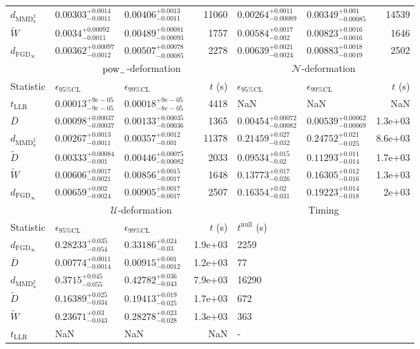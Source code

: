 \begin{tabular}{l|llr|llr}
	$d_{\mathrm{MMD}^{2}_{u}}$ & $0.00303_{-0.0011}^{+0.0014}$ & $0.00406_{-0.0011}^{+0.0013}$ & 11060 & $0.00264_{-0.00089}^{+0.0011}$ & $0.00349_{-0.00085}^{+0.001}$ & 14539 \\
	$\widetilde{W}$ & $0.0034_{-0.0011}^{+0.00092}$ & $0.00489_{-0.00093}^{+0.00081}$ & 1757 & $0.00584_{-0.002}^{+0.0017}$ & $0.00823_{-0.0016}^{+0.0016}$ & 1646 \\
	$d_{\mathrm{FGD}_{\infty}}$ & $0.00362_{-0.0012}^{+0.00097}$ & $0.00507_{-0.00085}^{+0.00078}$ & 2278 & $0.00639_{-0.0024}^{+0.0021}$ & $0.00883_{-0.0019}^{+0.0018}$ & 2502 \\
	\toprule
	\multicolumn{1}{c}{} & \multicolumn{3}{c}{$\rm{pow}_{-}$-deformation} & \multicolumn{3}{c}{$\mathcal{N}$-deformation} \\
	Statistic & $\epsilon_{95\%\mathrm{CL}}$ & $\epsilon_{99\%\mathrm{CL}}$ & $t$ (s) & $\epsilon_{95\%\mathrm{CL}}$ & $\epsilon_{99\%\mathrm{CL}}$ & $t$ (s) \\
	\midrule
	$t_{\mathrm{LLR}}$ & $0.00013_{-9e-05}^{+9e-05}$ & $0.00018_{-8e-05}^{+9e-05}$ & 4418 & NaN & NaN & NaN \\
	$\overline{D}$ & $0.00098_{-0.00037}^{+0.00037}$ & $0.00133_{-0.00036}^{+0.00035}$ & 1365 & $0.00454_{-0.00082}^{+0.00072}$ & $0.00539_{-0.00069}^{+0.00062}$ & 1.3e+03 \\
	$d_{\mathrm{MMD}^{2}_{u}}$ & $0.00267_{-0.0011}^{+0.0013}$ & $0.00357_{-0.001}^{+0.0012}$ & 11378 & $0.21459_{-0.032}^{+0.027}$ & $0.24752_{-0.025}^{+0.021}$ & 8.6e+03 \\
	$\widetilde{D}$ & $0.00333_{-0.001}^{+0.00084}$ & $0.00446_{-0.00082}^{+0.00075}$ & 2033 & $0.09534_{-0.02}^{+0.015}$ & $0.11293_{-0.014}^{+0.011}$ & 1.7e+03 \\
	$\widetilde{W}$ & $0.00606_{-0.0021}^{+0.0017}$ & $0.00856_{-0.0017}^{+0.0015}$ & 1648 & $0.13773_{-0.026}^{+0.017}$ & $0.16305_{-0.016}^{+0.012}$ & 1.3e+03 \\
	$d_{\mathrm{FGD}_{\infty}}$ & $0.00659_{-0.0024}^{+0.002}$ & $0.00905_{-0.0017}^{+0.0017}$ & 2507 & $0.16354_{-0.031}^{+0.02}$ & $0.19223_{-0.018}^{+0.014}$ & 2e+03 \\
	\toprule
	\multicolumn{1}{c}{} & \multicolumn{3}{c}{$\mathcal{U}$-deformation} & \multicolumn{3}{c}{Timing} \\
	Statistic & $\epsilon_{95\%\mathrm{CL}}$ & $\epsilon_{99\%\mathrm{CL}}$ & $t$ (s) & $t^{\mathrm{null}}$ (s) \\
	\midrule
	$d_{\mathrm{FGD}_{\infty}}$ & $0.28233_{-0.054}^{+0.035}$ & $0.33186_{-0.03}^{+0.024}$ & 1.9e+03 & 2259 \\
	$\overline{D}$ & $0.00774_{-0.0014}^{+0.0011}$ & $0.00915_{-0.0012}^{+0.001}$ & 1.2e+03 & 77 \\
	$d_{\mathrm{MMD}^{2}_{u}}$ & $0.3715_{-0.055}^{+0.045}$ & $0.42782_{-0.043}^{+0.036}$ & 7.9e+03 & 16290 \\
	$\widetilde{D}$ & $0.16389_{-0.034}^{+0.025}$ & $0.19413_{-0.025}^{+0.019}$ & 1.7e+03 & 672 \\
	$\widetilde{W}$ & $0.23671_{-0.043}^{+0.03}$ & $0.28278_{-0.028}^{+0.023}$ & 1.3e+03 & 363 \\
	$t_{\mathrm{LLR}}$ & NaN & NaN & NaN & - \\
	\bottomrule
\end{tabular}